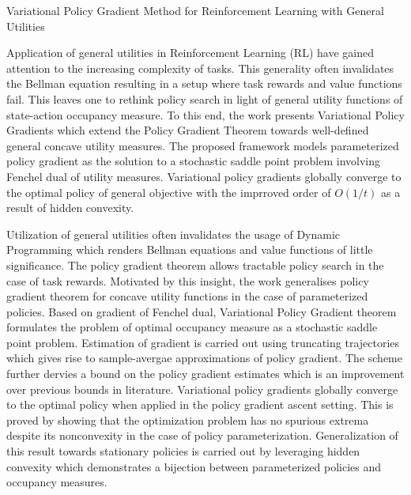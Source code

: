 \documentclass[11pt,letterpaper]{article}
\begin{document}
\begin{center}
  \large{Variational Policy Gradient Method for Reinforcement Learning with General Utilities}
\end{center}
Application of general utilities in Reinforcement Learning (RL) have gained attention to the increasing complexity of tasks. This generality often invalidates the Bellman equation resulting in a setup where task rewards and value functions fail. This leaves one to rethink policy search in light of general utility functions of state-action occupancy measure. To this end, the work presents Variational Policy Gradients which extend the Policy Gradient Theorem towards well-defined general concave utility measures. The proposed framework models parameterized policy gradient as the solution to a stochastic saddle point problem involving Fenchel dual of utility measures. Variational policy gradients globally converge to the optimal policy of general objective with the imprroved order of $O(1/t)$ as a result of hidden convexity. 

Utilization of general utilities often invalidates the usage of Dynamic Programming which renders Bellman equations and value functions of little significance. The policy gradient theorem allows tractable policy search in the case of task rewards. Motivated by this insight, the work generalises policy gradient theorem for concave utility functions in the case of parameterized policies. Based on gradient of Fenchel dual, Variational Policy Gradient theorem formulates the problem of optimal occupancy measure as a stochastic saddle point problem. Estimation of gradient is carried out using truncating trajectories which gives rise to sample-avergae approximations of policy gradient. The scheme further dervies a bound on the policy gradient estimates which is an improvement over previous bounds in literature. Variational policy gradients globally converge to the optimal policy when applied in the policy gradient ascent setting. This is proved by showing that the optimization problem has no spurious extrema despite its nonconvexity in the case of policy parameterization. Generalization of this result towards stationary policies is carried out by leveraging hidden convexity which demonstrates a bijection between parameterized policies and occupancy measures. 
\end{document}
